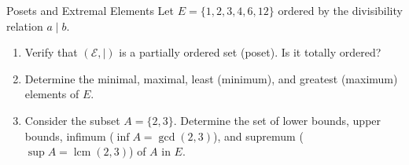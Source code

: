 \begin{exercise}{Posets and Extremal Elements}
Let $E = \{1, 2, 3, 4, 6, 12\}$ ordered by the divisibility relation $a \mid b$.
\begin{enumerate}[leftmargin=1.5em,itemsep=2pt]
  \item Verify that $(\mathcal{E}, \mid)$ is a partially ordered set (poset). Is it totally ordered?
  \item Determine the minimal, maximal, least (minimum), and greatest (maximum) elements of $E$.
  \item Consider the subset $A = \{2, 3\}$. Determine the set of lower bounds, upper bounds, infimum ($\inf A = \gcd(2,3)$), and supremum ($\sup A = \operatorname{lcm}(2,3)$) of $A$ in $E$.
\end{enumerate}
\end{exercise}

\begin{tabletworkspace}[5.0cm]
\end{tabletworkspace}

